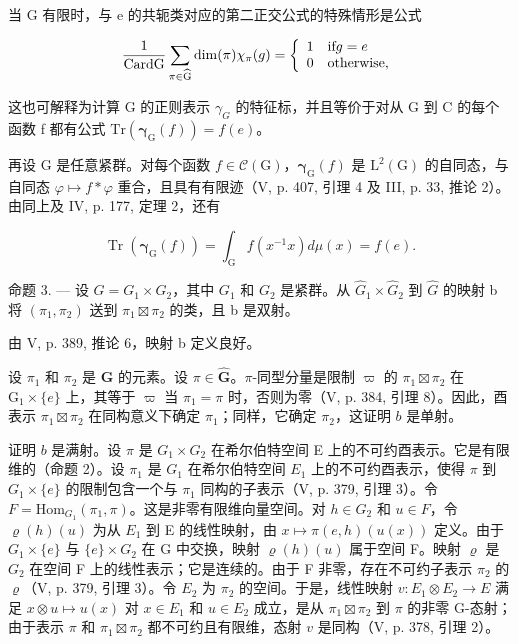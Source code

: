 当 G 有限时，与 e 的共轭类对应的第二正交公式的特殊情形是公式

\[
\frac {1}{\mathrm{CardG}} \sum_ {\pi \in \widehat {\mathrm{G}}} \dim (\pi) \chi _ {\pi} (g) = \left\{ \begin{array}{l l} 1 & \text {if} g = e \\ 0 & \text {otherwise}, \end{array} \right.
\]

这也可解释为计算 G 的正则表示 \(\gamma_{G}\) 的特征标，并且等价于对从 G 到 C 的每个函数 f 都有公式 \(\mathrm{Tr}(\boldsymbol{\gamma}_{\mathrm{G}}(f)) = f(e)\)。

再设 G 是任意紧群。对每个函数 \(f \in \mathcal{C}(\mathrm{G})\)，\(\boldsymbol{\gamma}_{\mathrm{G}}(f)\) 是 \(\mathrm{L}^{2}(\mathrm{G})\) 的自同态，与自同态 \(\varphi \mapsto f * \varphi\) 重合，且具有有限迹（V, p. 407, 引理 4 及 III, p. 33, 推论 2）。由同上及 IV, p. 177, 定理 2，还有

\[
\operatorname{Tr} \left(\boldsymbol {\gamma} _ {\mathrm{G}} (f)\right) = \int_ {\mathrm{G}} f \left(x ^ {- 1} x\right) d \mu (x) = f (e).
\]

命题 3. --- 设 \(G = G_{1} \times G_{2}\)，其中 \(G_{1}\) 和 \(G_{2}\) 是紧群。从 \(\widehat{G}_{1} \times \widehat{G}_{2}\) 到 \(\widehat{G}\) 的映射 b 将 \((\pi_{1}, \pi_{2})\) 送到 \(\pi_{1} \boxtimes \pi_{2}\) 的类，且 b 是双射。

由 V, p. 389, 推论 6，映射 b 定义良好。

设 \(\pi_1\) 和 \(\pi_2\) 是 \(\widehat{\mathbf{G}}\) 的元素。设 \(\pi \in \widehat{\mathbf{G}}\)。\(\pi\)-同型分量是限制 \(\varpi\) 的 \(\pi_1 \boxtimes \pi_2\) 在 \(\mathrm{G}_1 \times \{e\}\) 上，其等于 \(\varpi\) 当 \(\pi_1 = \pi\) 时，否则为零（V, p. 384, 引理 8）。因此，酉表示 \(\pi_1 \boxtimes \pi_2\) 在同构意义下确定 \(\pi_1\)；同样，它确定 \(\pi_2\)，这证明 \(b\) 是单射。

证明 \(b\) 是满射。设 \(\pi\) 是 \(G_1 \times G_2\) 在希尔伯特空间 E 上的不可约酉表示。它是有限维的（命题 2）。设 \(\pi_1\) 是 \(G_1\) 在希尔伯特空间 \(E_1\) 上的不可约酉表示，使得 \(\pi\) 到 \(G_1 \times \{e\}\) 的限制包含一个与 \(\pi_1\) 同构的子表示（V, p. 379, 引理 3）。令 \(F = \text{Hom}_{G_1}(\pi_1, \pi)\)。这是非零有限维向量空间。对 \(h \in G_2\) 和 \(u \in F\)，令 \(\varrho(h)(u)\) 为从 \(E_1\) 到 E 的线性映射，由 \(x \mapsto \pi(e, h)(u(x))\) 定义。由于 \(G_1 \times \{e\}\) 与 \(\{e\} \times G_2\) 在 G 中交换，映射 \(\varrho(h)(u)\) 属于空间 F。映射 \(\varrho\) 是 \(G_2\) 在空间 F 上的线性表示；它是连续的。由于 F 非零，存在不可约子表示 \(\pi_2\) 的 \(\varrho\)（V, p. 379, 引理 3）。令 \(E_2\) 为 \(\pi_2\) 的空间。于是，线性映射 \(v: E_1 \otimes E_2 \to E\) 满足 \(x \otimes u \mapsto u(x)\) 对 \(x \in E_1\) 和 \(u \in E_2\) 成立，是从 \(\pi_1 \boxtimes \pi_2\) 到 \(\pi\) 的非零 G-态射；由于表示 \(\pi\) 和 \(\pi_1 \boxtimes \pi_2\) 都不可约且有限维，态射 \(v\) 是同构（V, p. 378, 引理 2）。

